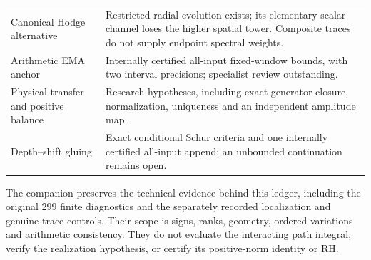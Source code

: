 \begin{longtable}{@{}p{}p{}@{}}
Canonical Hodge alternative &
Restricted radial evolution exists; its elementary scalar channel
loses the higher spatial tower. Composite traces do not supply
endpoint spectral weights.\\
Arithmetic EMA anchor &
Internally certified all-input fixed-window bounds, with two
interval precisions; specialist review outstanding.\\
Physical transfer and positive balance &
Research hypotheses, including exact generator closure,
normalization, uniqueness and an independent amplitude map.\\
Depth--shift gluing &
Exact conditional Schur criteria and one internally certified
all-input append; an unbounded continuation remains open.\\
\end{longtable}
\renewcommand{\arraystretch}{1}

The companion preserves the technical evidence behind this ledger,
including the original 299 finite diagnostics and the separately
recorded localization and genuine-trace controls. Their scope is signs,
ranks, geometry, ordered variations and arithmetic consistency. They do
not evaluate the interacting path integral, verify the realization
hypothesis, or certify its positive-norm identity or RH.
